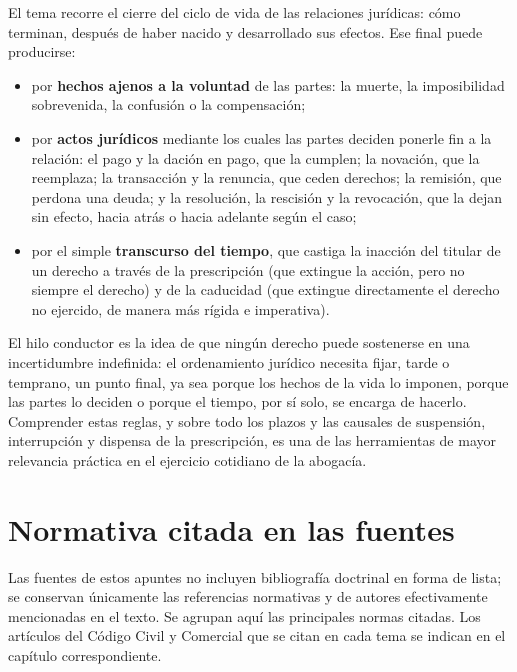 \documentclass[12pt,oneside]{book}
\begin{document}
El tema recorre el cierre del ciclo de vida de las relaciones jurídicas: cómo terminan, después de haber nacido y desarrollado sus efectos. Ese final puede producirse:

\begin{itemize}
    \item por \textbf{hechos ajenos a la voluntad} de las partes: la muerte, la imposibilidad sobrevenida, la confusión o la compensación;
    \item por \textbf{actos jurídicos} mediante los cuales las partes deciden ponerle fin a la relación: el pago y la dación en pago, que la cumplen; la novación, que la reemplaza; la transacción y la renuncia, que ceden derechos; la remisión, que perdona una deuda; y la resolución, la rescisión y la revocación, que la dejan sin efecto, hacia atrás o hacia adelante según el caso;
    \item por el simple \textbf{transcurso del tiempo}, que castiga la inacción del titular de un derecho a través de la prescripción (que extingue la acción, pero no siempre el derecho) y de la caducidad (que extingue directamente el derecho no ejercido, de manera más rígida e imperativa).
\end{itemize}

El hilo conductor es la idea de que ningún derecho puede sostenerse en una incertidumbre indefinida: el ordenamiento jurídico necesita fijar, tarde o temprano, un punto final, ya sea porque los hechos de la vida lo imponen, porque las partes lo deciden o porque el tiempo, por sí solo, se encarga de hacerlo. Comprender estas reglas, y sobre todo los plazos y las causales de suspensión, interrupción y dispensa de la prescripción, es una de las herramientas de mayor relevancia práctica en el ejercicio cotidiano de la abogacía.

\appendix
\chapter{Normativa citada en las fuentes}
\label{app:normativa}

Las fuentes de estos apuntes no incluyen bibliografía doctrinal en forma de lista; se conservan únicamente las referencias normativas y de autores efectivamente mencionadas en el texto. Se agrupan aquí las principales normas citadas. Los artículos del Código Civil y Comercial que se citan en cada tema se indican en el capítulo correspondiente.
\end{document}
